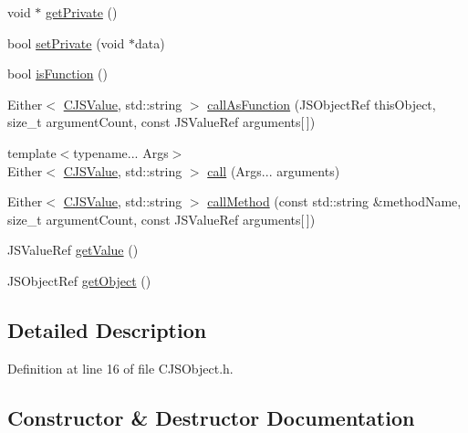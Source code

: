 \begin{DoxyCompactItemize}
\item 
void $\ast$ \mbox{\hyperlink{classcpp__javascriptcore_1_1_c_j_s_object_a2627185e8dc48a71d43f7a7dbb1e6f12}{get\+Private}} ()
\item 
bool \mbox{\hyperlink{classcpp__javascriptcore_1_1_c_j_s_object_a34c765e46113b0574dd0e5d2624d81b7}{set\+Private}} (void $\ast$data)
\item 
bool \mbox{\hyperlink{classcpp__javascriptcore_1_1_c_j_s_object_a490246c8e550d1769a9a1bdc2eb96de4}{is\+Function}} ()
\item 
Either$<$ \mbox{\hyperlink{classcpp__javascriptcore_1_1_c_j_s_value}{C\+J\+S\+Value}}, std\+::string $>$ \mbox{\hyperlink{classcpp__javascriptcore_1_1_c_j_s_object_ad85abe5c623cd8f20c34d109dbcf5edf}{call\+As\+Function}} (J\+S\+Object\+Ref this\+Object, size\+\_\+t argument\+Count, const J\+S\+Value\+Ref arguments\mbox{[}$\,$\mbox{]})
\item 
{\footnotesize template$<$typename... Args$>$ }\\Either$<$ \mbox{\hyperlink{classcpp__javascriptcore_1_1_c_j_s_value}{C\+J\+S\+Value}}, std\+::string $>$ \mbox{\hyperlink{classcpp__javascriptcore_1_1_c_j_s_object_a3074d05cfc9a38a6fbd76d4b01b18450}{call}} (Args... arguments)
\item 
Either$<$ \mbox{\hyperlink{classcpp__javascriptcore_1_1_c_j_s_value}{C\+J\+S\+Value}}, std\+::string $>$ \mbox{\hyperlink{classcpp__javascriptcore_1_1_c_j_s_object_a83d547bf7f937e8736c037c64d1c43d7}{call\+Method}} (const std\+::string \&method\+Name, size\+\_\+t argument\+Count, const J\+S\+Value\+Ref arguments\mbox{[}$\,$\mbox{]})
\item 
J\+S\+Value\+Ref \mbox{\hyperlink{classcpp__javascriptcore_1_1_c_j_s_object_a667d9d37ffd019c70dd34a325b7488b2}{get\+Value}} ()
\item 
J\+S\+Object\+Ref \mbox{\hyperlink{classcpp__javascriptcore_1_1_c_j_s_object_a6f97c34295cb1ee7709f6270fedb1c54}{get\+Object}} ()
\end{DoxyCompactItemize}


\subsection{Detailed Description}


Definition at line 16 of file C\+J\+S\+Object.\+h.



\subsection{Constructor \& Destructor Documentation}
\mbox{\label{classcpp__javascriptcore_1_1_c_j_s_object_a66d2176f271cac5329dcfe1885fffcb5}} 
